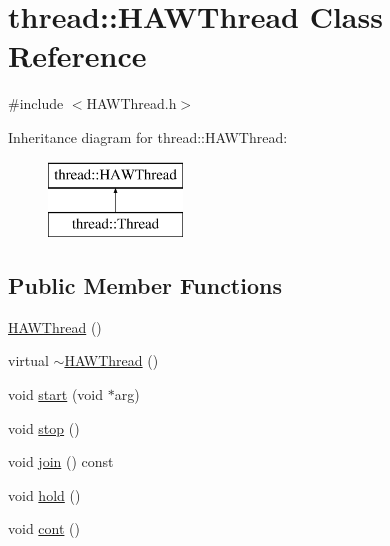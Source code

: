 \hypertarget{classthread_1_1_h_a_w_thread}{\section{thread\-:\-:H\-A\-W\-Thread Class Reference}
\label{classthread_1_1_h_a_w_thread}
}


{\ttfamily \#include $<$H\-A\-W\-Thread.\-h$>$}

Inheritance diagram for thread\-:\-:H\-A\-W\-Thread\-:\begin{figure}[H]
\begin{center}
\leavevmode
\includegraphics[height=2.000000cm]{classthread_1_1_h_a_w_thread}
\end{center}
\end{figure}
\subsection*{Public Member Functions}
\begin{DoxyCompactItemize}
\item 
\hyperlink{classthread_1_1_h_a_w_thread_a7ae3280c8aee6ae6536c736a20d92e8d}{H\-A\-W\-Thread} ()
\item 
virtual \hyperlink{classthread_1_1_h_a_w_thread_a84706dda23aa384a43ced901381e795b}{$\sim$\-H\-A\-W\-Thread} ()
\item 
void \hyperlink{classthread_1_1_h_a_w_thread_ae08d268c337511a1e67fbbeefcb1e89d}{start} (void $\ast$arg)
\item 
void \hyperlink{classthread_1_1_h_a_w_thread_ae8a89c83fd7e9b9a712c19f636ab2638}{stop} ()
\item 
void \hyperlink{classthread_1_1_h_a_w_thread_a4732efa3445c499f1723971acc07863f}{join} () const 
\item 
void \hyperlink{classthread_1_1_h_a_w_thread_a18f2a0cc61833e98b18e56ea541fa38b}{hold} ()
\item 
void \hyperlink{classthread_1_1_h_a_w_thread_a4c480261e3236c90c8de73be55650ba4}{cont} ()
\end{DoxyCompactItemize}
